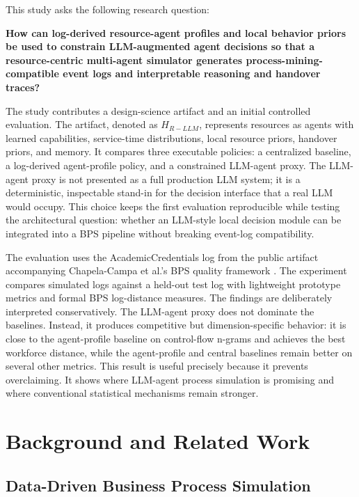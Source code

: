 This study asks the following research question:

\textbf{How can log-derived resource-agent profiles and local behavior
priors be used to constrain LLM-augmented agent decisions so that a
resource-centric multi-agent simulator generates
process-mining-compatible event logs and interpretable reasoning and
handover traces?}

The study contributes a design-science artifact and an initial
controlled evaluation. The artifact, denoted as \(H_{R-LLM}\),
represents resources as agents with learned capabilities, service-time
distributions, local resource priors, handover priors, and memory. It
compares three executable policies: a centralized baseline, a
log-derived agent-profile policy, and a constrained LLM-agent proxy. The
LLM-agent proxy is not presented as a full production LLM system; it is
a deterministic, inspectable stand-in for the decision interface that a
real LLM would occupy. This choice keeps the first evaluation
reproducible while testing the architectural question: whether an
LLM-style local decision module can be integrated into a BPS pipeline
without breaking event-log compatibility.

The evaluation uses the AcademicCredentials log from the public artifact
accompanying Chapela-Campa et al.'s BPS quality framework
\cite{chapela2025quality}. The experiment compares simulated logs against a held-out
test log with lightweight prototype metrics and formal BPS log-distance
measures. The findings are deliberately interpreted conservatively. The
LLM-agent proxy does not dominate the baselines. Instead, it produces
competitive but dimension-specific behavior: it is close to the
agent-profile baseline on control-flow n-grams and achieves the best
workforce distance, while the agent-profile and central baselines remain
better on several other metrics. This result is useful precisely because
it prevents overclaiming. It shows where LLM-agent process simulation is
promising and where conventional statistical mechanisms remain stronger.

\section{Background and Related
Work}\label{background-and-related-work}

\subsection{Data-Driven Business Process
Simulation}\label{data-driven-business-process-simulation}

